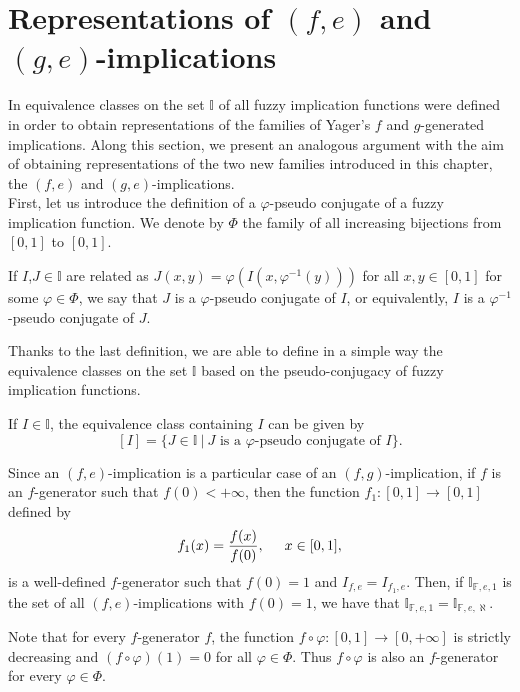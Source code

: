 \section{Representations of $(f,e)$ and $(g,e)$-implications}\label{section:representation(f,e)}

In \cite{Vemuri2014} equivalence classes on the set $\mathbb{I}$ of all fuzzy implication functions were defined in order to obtain representations of the families of Yager's $f$ and $g$-generated implications. Along this section, we present an analogous argument with the aim of obtaining representations of the two new families introduced in this chapter, the $(f,e)$ and $(g,e)$-implications.\\


First, let us introduce the definition of a $\varphi$-pseudo conjugate of a fuzzy implication function. We denote by $\Phi$ the family of all increasing bijections from $[0,1]$ to $[0,1]$.

\begin{definition} If $I$,$J \in \mathbb{I}$ are related as $J(x,y) = \varphi ( I (x, \varphi^{-1}(y)))$ for all $x,y \in [0,1]$ for some $\varphi \in \Phi$, we say that $J$ is a $\varphi$-pseudo conjugate of $I$, or equivalently, $I$ is a $\varphi^{-1}$-pseudo conjugate of $J$.
\end{definition}

Thanks to the last definition, we are able to define in a simple way the equivalence classes on the set $\mathbb{I}$ based on the pseudo-conjugacy of fuzzy implication functions.

\begin{definition}
	If $I \in \mathbb{I}$, the equivalence class containing $I$ can be given by
	$$ [I] = \{ J \in \mathbb{I} ~|~ J \text{ is a } \varphi\text{-pseudo conjugate of } I \}.$$
\end{definition}
\begin{remark} Since an $(f,e)$-implication is a particular case of an $(f,g)$-implication, if $f$ is an $f$-generator such that $f(0)<+\infty$, then the function $f_1:[0,1] \to [0,1]$ defined by
	$$ f_1(x)=\frac{f(x)}{f(0)}, \hspace{0.5cm} x\in[0,1],$$
	is a well-defined $f$-generator such that $f(0)=1$ and $I_{f,e} = I_{f_1,e}$. Then, if $\mathbb{I}_{\mathbb{F},e,1}$ is the set of all $(f,e)$-implications with $f(0)=1$, we have that $\mathbb{I}_{\mathbb{F},e,1}=\mathbb{I}_{\mathbb{F},e,\aleph}$.
\end{remark}
\begin{remark} Note that for every $f$-generator $f$, the function $ f \circ \varphi : [0,1] \to [0, +\infty]$ is strictly decreasing and $(f \circ \varphi)(1)=0$ for all $ \varphi \in \Phi$. Thus $f \circ \varphi$ is also an $f$-generator for every $\varphi \in \Phi$.
\end{remark}

